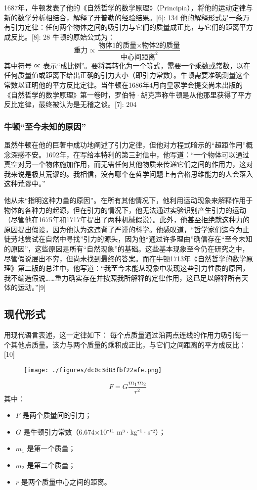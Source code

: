 1687年，牛顿发表了他的《自然哲学的数学原理》（Principia），将他的运动定律与新的数学分析相结合，解释了开普勒的经验结果。[6]: 134 他的解释形式是一条万有引力定律：任何两个物体之间的吸引力与它们的质量成正比，与它们的距离平方成反比。[8]: 28 牛顿的原始公式为：
\[
\text{重力} \propto \frac{\text{物体1的质量} \times \text{物体2的质量}}{\text{中心间距离}^2}~
\]
其中符号 ∝ 表示“成比例”。要将其转化为一个等式，需要一个乘数或常数，以在任何质量值或距离下给出正确的引力大小（即引力常数）。牛顿需要准确测量这个常数以证明他的平方反比定律。当牛顿在1686年4月向皇家学会提交尚未出版的《自然哲学的数学原理》第一卷时，罗伯特·胡克声称牛顿是从他那里获得了平方反比定律，最终被认为是无稽之谈。[7]: 204
\subsubsection{牛顿“至今未知的原因”}
虽然牛顿在他的巨著中成功地阐述了引力定律，但他对方程式暗示的“超距作用”概念深感不安。1692年，在写给本特利的第三封信中，他写道：“一个物体可以通过真空对另一个物体施加作用，而无需任何其他物质来传递它们之间的作用力，这对我来说是极其荒谬的。我相信，没有哪个在哲学问题上有合格思维能力的人会落入这种荒谬中。”

他从未“指明这种力量的原因”。在所有其他情况下，他利用运动现象来解释作用于物体的各种力的起源，但在引力的情况下，他无法通过实验识别产生引力的运动（尽管他在1675年和1717年提出了两种机械假说）。此外，他甚至拒绝就这种力的原因提出假设，因为他认为这违背了严谨的科学。他感叹道，“哲学家们迄今为止徒劳地尝试在自然中寻找”引力的源头，因为他“通过许多理由”确信存在“至今未知的原因”，这些原因是所有“自然现象”的基础。这些基本现象至今仍在研究之中，尽管假说层出不穷，但尚未找到最终的答案。而在牛顿1713年《自然哲学的数学原理》第二版的总注中，他写道：“我至今未能从现象中发现这些引力性质的原因，我不编造假说……重力确实存在并按照我所解释的定律作用，这已足以解释所有天体的运动。”[9]
\subsection{现代形式}
用现代语言表述，这一定律如下：
每个点质量通过沿两点连线的作用力吸引每一个其他点质量。该力与两个质量的乘积成正比，与它们之间距离的平方成反比：[10] 
\begin{figure}[ht]
\centering
\texttt{[image: ./figures/dc0c3d83fbf22afe.png]}
\caption{} \label{fig_NEWW_1}
\end{figure}
\[
F = G \frac{m_1 m_2}{r^2}~
\]
其中：
\begin{itemize}
\item \( F \) 是两个质量间的引力；
\item \( G \) 是牛顿引力常数（6.674×10⁻¹¹ m³·kg⁻¹·s⁻²）；
\item \( m_1 \) 是第一个质量；
\item \( m_2 \) 是第二个质量；
\item \( r \) 是两个质量中心之间的距离。
\end{itemize}
